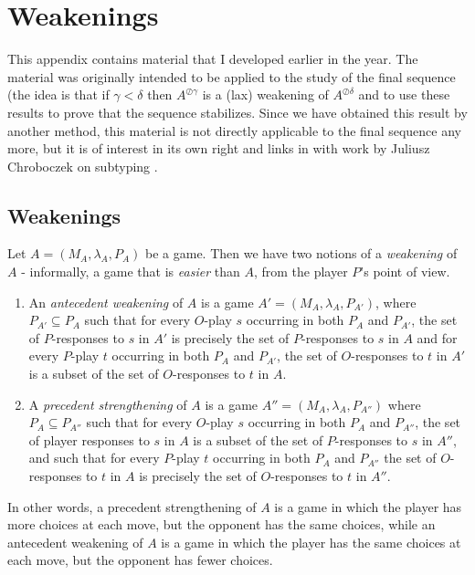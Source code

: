 \documentclass[11pt]{article} %
\theoremstyle{plain} %
\theoremstyle{definition} %
\theoremstyle{note}
\theoremstyle{exercisestyle}
\newcommand{\sequoid}{\oslash}
\renewcommand{\subset}{\subseteq}
\begin{document}
\section{Weakenings}

This appendix contains material that I developed earlier in the year.  The material was originally intended to be applied to the study of the final sequence (the idea is that if $\gamma<\delta$ then $A^{\sequoid\gamma}$ is a (lax) weakening of $A^{\sequoid\delta}$ and to use these results to prove that the sequence stabilizes.  Since we have obtained this result by another method, this material is not directly applicable to the final sequence any more, but it is of interest in its own right and links in with work by Juliusz Chroboczek on subtyping \cite{juliuszthesis}.  

\subsection{Weakenings}

Let $A=(M_A,\lambda_A,P_A)$ be a game.  Then we have two notions of a \emph{weakening} of $A$ - informally, a game that is \emph{easier} than $A$, from the player $P$'s point of view.  

\begin{enumerate}
  \item An \emph{antecedent weakening} of $A$ is a game $A'=(M_A,\lambda_A,P_{A'})$, where $P_{A'}\subset P_{A}$ such that for every $O$-play $s$ occurring in both $P_A$ and $P_{A'}$, the set of $P$-responses to $s$ in $A'$ is precisely the set of $P$-responses to $s$ in $A$ and for every $P$-play $t$ occurring in both $P_A$ and $P_{A'}$, the set of $O$-responses to $t$ in $A'$ is a subset of the set of $O$-responses to $t$ in $A$.  
  \item A \emph{precedent strengthening} of $A$ is a game $A''=(M_A,\lambda_A,P_{A''})$ where $P_A\subset P_{A''}$ such that for every $O$-play $s$ occurring in both $P_A$ and $P_{A''}$, the set of player responses to $s$ in $A$ is a subset of the set of $P$-responses to $s$ in $A''$, and such that for every $P$-play $t$ occurring in both $P_A$ and $P_{A''}$ the set of $O$-responses to $t$ in $A$ is precisely the set of $O$-responses to $t$ in $A''$.  
\end{enumerate}

In other words, a precedent strengthening of $A$ is a game in which the player has more choices at each move, but the opponent has the same choices, while an antecedent weakening of $A$ is a game in which the player has the same choices at each move, but the opponent has fewer choices.  
\end{document}

